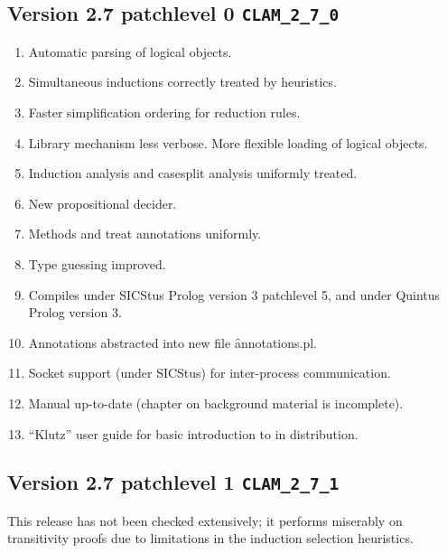 \subsection {Version 2.7 patchlevel 0 {\tt CLAM\_2\_7\_0}}
\begin{enumerate}
\item Automatic parsing of  logical objects.
\item Simultaneous inductions correctly treated by 
heuristics.
\item Faster simplification ordering for reduction rules.
\item Library mechanism less verbose.  More flexible loading of
          logical objects.
\item Induction analysis and casesplit analysis uniformly treated.
\item New propositional decider.
\item Methods  and  treat annotations
          uniformly.
\item Type guessing improved.
\item Compiles under SICStus Prolog version 3 patchlevel 5, and
          under Quintus Prolog version 3.
 \item Annotations abstracted into new file \f{annotations.pl}.
\item Socket support (under SICStus) for inter-process
          communication.
\item Manual up-to-date (chapter on background material is
          incomplete).
\item ``Klutz'' user guide for basic introduction to \clam in
distribution.
\end{enumerate}

\subsection {Version 2.7 patchlevel 1 {\tt CLAM\_2\_7\_1}}
This release has not been checked extensively; it performs miserably
on transitivity proofs due to limitations in the  induction selection heuristics.

